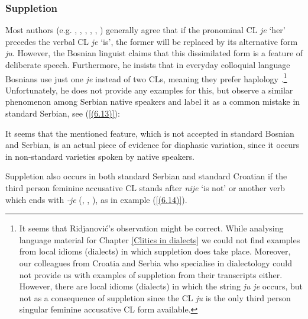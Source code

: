 \subsubsection{Suppletion}
\label{Suppletion}
Most authors (e.g. \citealt[306]{Stevanovic75}, \citealt[210, 597]{Baric97}, \citealt[472]{JHP00}, \citealt[366]{MrazovicVukadinovic09}, \citealt[434]{Ridjanovic12}, \citealt[28, 97]{PiperKlajn14}) generally agree that if the pronominal CL \textit{je} ‘her’ precedes the verbal CL \textit{je} ‘is’, the former will be replaced by its alternative form \textit{ju}. However, the Bosnian linguist \citet[434]{Ridjanovic12} claims that this dissimilated form is a feature of deliberate speech. Furthermore, he insists that in everyday colloquial language Bosnians use just one \textit{je} instead of two CLs, meaning they prefer haplology \citep[cf.][434]{Ridjanovic12}.\footnote{It seems that Ridjanović’s observation might be correct. While analysing language material for Chapter \ref{Clitics in dialects} we could not find examples from local idioms (dialects) in which suppletion does take place. Moreover, our colleagues from Croatia and Serbia who specialise in dialectology could not provide us with examples of suppletion from their transcripts either. However, there are local idioms (dialects) in which the string \textit{ju je} occurs, but not as a consequence of suppletion since the CL \textit{ju} is the only third person singular feminine accusative CL form available.} Unfortunately, he does not provide any examples for this, but \citet[97]{PiperKlajn14} observe a similar phenomenon among Serbian native speakers and label it as a common mistake in standard Serbian, see (\ref{(6.13)}):


\noindent It seems that the mentioned feature, which is not accepted in standard Bosnian and Serbian, is an actual piece of evidence for diaphasic variation, since it occurs in non-standard varieties spoken by native speakers. 

Suppletion also occurs in both standard Serbian and standard Croatian if the third person feminine accusative CL stands after \textit{nije} ‘is not’ or another verb which ends with \textit{-je} (\citealt[cf.][210, 597]{Baric97}, \citealt[366]{MrazovicVukadinovic09}, \citealt[97]{PiperKlajn14}), as in example (\ref{(6.14)}).

